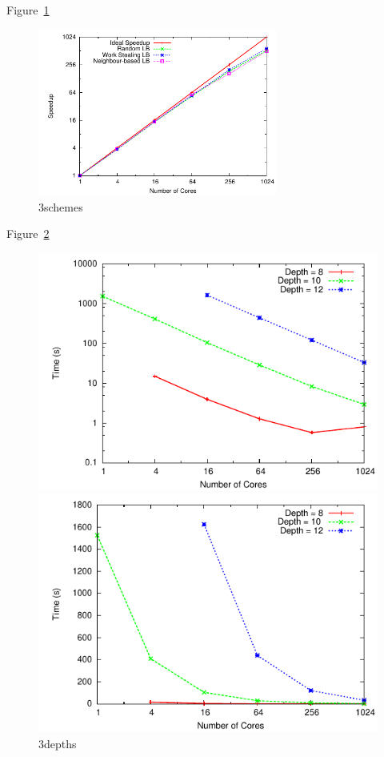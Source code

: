 \documentclass[11pt]{article}
\begin{document}
Figure~\ref{3schemes}
\begin{figure}
\centering
\includegraphics[width=0.7\textwidth]{plots/3schemes.pdf}
\caption{3schemes}
\label{3schemes}
\end{figure}
 
Figure~\ref{3depths}
\begin{figure}
\begin{minipage}{0.5\linewidth}
\centering
\includegraphics[width=\textwidth]{plots/3depths.pdf}
\end{minipage}
\begin{minipage}{0.5\linewidth}
\centering
\includegraphics[width=\textwidth]{plots/3depthsnolog.pdf}
\end{minipage}
\caption{3depths}
\label{3depths}
\end{figure}
 
\end{document}
